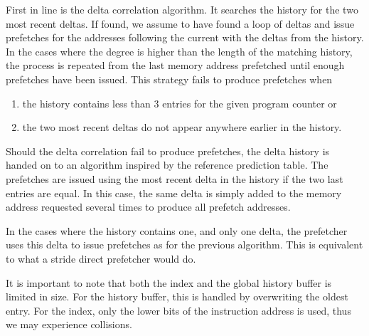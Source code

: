 First in line is the delta correlation algorithm.
It searches the history for the two most recent deltas.
If found, we assume to have found a loop of deltas and issue prefetches for the
addresses following the current with the deltas from the history.
In the cases where the degree is higher than the length of the matching history,
the process is repeated from the last memory address prefetched until enough
prefetches have been issued.
This strategy fails to produce prefetches when

\begin{enumerate}
	\item the history contains less than 3 entries for the given program
		counter or
	\item the two most recent deltas do not appear anywhere earlier in the
		history.
\end{enumerate}

Should the delta correlation fail to produce prefetches, the delta history is
handed on to an algorithm inspired by the reference prediction table.
The prefetches are issued using the most recent delta in the history if the two
last entries are equal.
In this case, the same delta is simply added to the memory address requested
several times to produce all prefetch addresses.

In the cases where the history contains one, and only one delta, the prefetcher
uses this delta to issue prefetches as for the previous algorithm.
This is equivalent to what a stride direct prefetcher would do.

It is important to note that both the index and the global history buffer is
limited in size. For the history buffer, this is handled by overwriting the
oldest entry. For the index, only the lower bits of the instruction address is
used, thus we may experience collisions.

